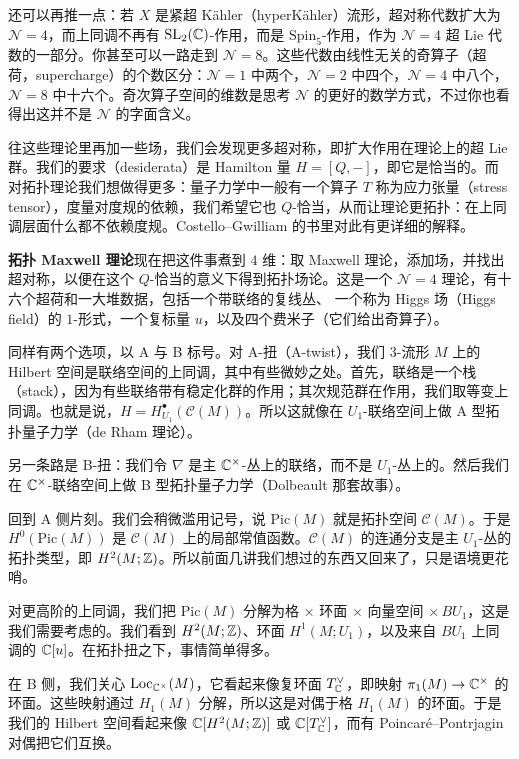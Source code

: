 还可以再推一点：若 $X$ 是紧超 Kähler（hyperKähler）流形，超对称代数扩大为 $\mathcal{N} = 4$，而上同调不再有 $\mathrm{SL}_2(\mathbb{C})$-作用，而是 $\mathrm{Spin}_5$-作用，作为 $\mathcal{N} = 4$ 超 Lie 代数的一部分。你甚至可以一路走到 $\mathcal{N} = 8$。这些代数由线性无关的奇算子（超荷，supercharge）的个数区分：$\mathcal{N} = 1$ 中两个，$\mathcal{N} = 2$ 中四个，$\mathcal{N} = 4$ 中八个，$\mathcal{N} = 8$ 中十六个。奇次算子空间的维数是思考 $\mathcal{N}$ 的更好的数学方式，不过你也看得出这并不是 $\mathcal{N}$ 的字面含义。

往这些理论里再加一些场，我们会发现更多超对称，即扩大作用在理论上的超 Lie 群。我们的要求（desiderata）是 Hamilton 量 $H = [Q,-]$，即它是恰当的。而对拓扑理论我们想做得更多：量子力学中一般有一个算子 $T$ 称为应力张量（stress tensor），度量对度规的依赖，我们希望它也 $Q$-恰当，从而让理论更拓扑：在上同调层面什么都不依赖度规。Costello--Gwilliam 的书里对此有更详细的解释。

\textbf{拓扑 Maxwell 理论}\quad 现在把这件事煮到 $4$ 维：取 Maxwell 理论，添加场，并找出超对称，以便在这个 $Q$-恰当的意义下得到拓扑场论。这是一个 $\mathcal{N} = 4$ 理论，有十六个超荷和一大堆数据，包括一个带联络的复线丛、
一个称为 Higgs 场（Higgs field）的 $1$-形式，一个复标量 $u$，以及四个费米子（它们给出奇算子）。

同样有两个选项，以 A 与 B 标号。对 A-扭（A-twist），我们 $3$-流形 $M$ 上的 Hilbert 空间是联络空间的上同调，其中有些微妙之处。首先，联络是一个栈（stack），因为有些联络带有稳定化群的作用；其次规范群在作用，我们取等变上同调。也就是说，$H = H^\bullet_{U_1}(\mathcal{C}(M))$。所以这就像在 $U_1$-联络空间上做 A 型拓扑量子力学（de Rham 理论）。

另一条路是 B-扭：我们令 $\nabla$ 是主 $\mathbb{C}^\times$-丛上的联络，而不是 $U_1$-丛上的。然后我们在 $\mathbb{C}^\times$-联络空间上做 B 型拓扑量子力学（Dolbeault 那套故事）。

回到 A 侧片刻。我们会稍微滥用记号，说 $\mathrm{Pic}(M)$ 就是拓扑空间 $\mathcal{C}(M)$。于是 $H^0(\mathrm{Pic}(M))$ 是 $\mathcal{C}(M)$ 上的局部常值函数。$\mathcal{C}(M)$ 的连通分支是主 $U_1$-丛的拓扑类型，即 $H^2(M;\mathbb{Z})$。所以前面几讲我们想过的东西又回来了，只是语境更花哨。

对更高阶的上同调，我们把 $\mathrm{Pic}(M)$ 分解为格 $\times$ 环面 $\times$ 向量空间 $\times\,BU_1$，这是我们需要考虑的。我们看到 $H^2(M;\mathbb{Z})$、环面 $H^1(M;U_1)$，以及来自 $BU_1$ 上同调的 $\mathbb{C}[u]$。在拓扑扭之下，事情简单得多。

在 B 侧，我们关心 $\mathrm{Loc}_{\mathbb{C}^\times}(M)$，它看起来像复环面 $T^\vee_{\mathbb{C}}$，即映射 $\pi_1(M)\to\mathbb{C}^\times$ 的环面。这些映射通过 $H_1(M)$ 分解，所以这是对偶于格 $H_1(M)$ 的环面。于是我们的 Hilbert 空间看起来像 $\mathbb{C}[H^2(M;\mathbb{Z})]$ 或 $\mathbb{C}[T^\vee_{\mathbb{C}}]$，而有 Poincaré--Pontrjagin 对偶把它们互换。

